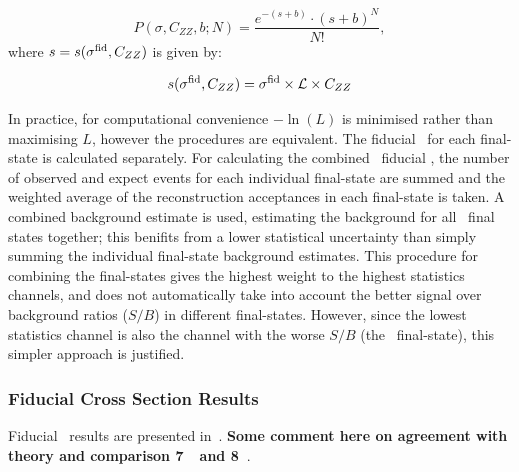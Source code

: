\begin{equation}
P(\sigma, C_{ZZ}, b; N) =
\frac{e^{-(s+b)}\cdot
     \left(s+b\right)^{N}}
     {N!},
\end{equation}
where $s=s(\sigma^{\rm fid}, C_{ZZ})$ is given by:

\begin{equation}
   s(\sigma^{\rm fid}, C_{ZZ}) = \sigma^{\rm fid}\times\mathcal{L}\times C_{ZZ} \\
\end{equation}

In practice, for computational convenience $-\ln(L)$ is minimised rather
than maximising $L$, however the procedures are equivalent. The fiducial
\cx\ for each final-state is calculated separately. For calculating the combined \ZZllll\
fiducial \cx, the number of observed and expect events for each individual
final-state are summed and the weighted average of the reconstruction
acceptances in each final-state is taken. A combined background estimate is used,
estimating the background for all \llll\ final states together; this benifits from a
lower statistical uncertainty than simply summing the individual final-state background
estimates. This procedure for combining the final-states gives the highest weight to the highest
statistics channels, and does not automatically take into account the better
signal over background ratios ($S/B$) in different final-states. However, since the
lowest statistics channel is also the channel with the worse $S/B$ (the \eeee\
final-state), this simpler approach is justified.

\subsubsection{Fiducial Cross Section Results}

Fiducial \cx\ results are presented in~. {\bf Some comment here
on agreement with theory and comparison 7~\tev\ and 8~\tev}.

